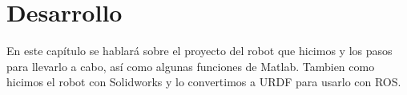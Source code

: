 \chapter{Desarrollo} \label{chap:desarrollo}
En este capítulo se hablará sobre el proyecto del robot que hicimos y los pasos para llevarlo a cabo, así como algunas funciones de Matlab. Tambien como hicimos el robot con Solidworks y lo convertimos a URDF para usarlo con ROS.